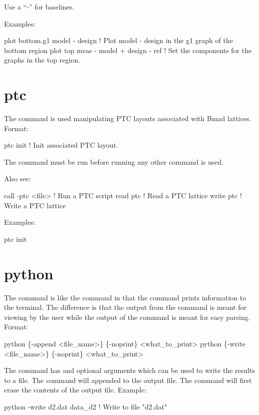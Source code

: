 Use a ``-'' for baselines. 

Examples:
\begin{example}
  plot bottom.g1 model - design        ! Plot model - design in the g1 graph of the bottom region
  plot top meas - model + design - ref ! Set the components for the graphs in the top region.
\end{example}

\section{ptc}
\label{s:ptc}

The  command is used manipulating PTC layouts associated with Bmad
lattices. Format:
\begin{example}
  ptc init            ! Init associated PTC layout.
\end{example}

\vskip 10pt 

The  command must be run before running any other  command is used.

Also see:
\begin{example}
  call -ptc <file>         ! Run a PTC script
  read ptc                 ! Read a PTC lattice
  write ptc                ! Write a PTC lattice
\end{example}

Examples:
\begin{example}
  ptc init
\end{example}

\section{python}
\label{s:python}

The  command is like the  command in that the  command
prints information to the terminal. The difference is that the output from the 
command is meant for viewing by the user while the output of the  command is
meant for easy parsing. Format:
\begin{example}
  python \{-append <file_name>\} \{-noprint\} <what_to_print>
  python \{-write <file_name>\} \{-noprint\} <what_to_print>
\end{example}

The  command has  and  optional arguments which can be
used to write the results to a file. The  command will appended to the
output file. The  command will first erase the contents of the output
file. Example:
\begin{example}
  python -write d2.dat data_d2    ! Write to file "d2.dat"
\end{example}

